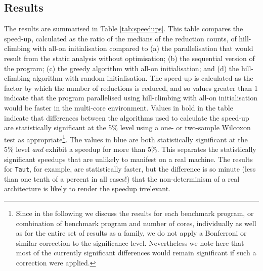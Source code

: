 \subsection{Results}

The results are summarised in Table \ref{tab:speedups}.  This table compares
the speed-up, calculated as the ratio of the medians of the reduction counts,
of hill-climbing with all-on initialisation compared to (a) the parallelisation
that would result from the static analysis without optimisation; (b) the
sequential version of the program; (c) the greedy algorithm with all-on
initialisation; and (d) the hill-climbing algorithm with random initialisation.
The speed-up is calculated as the factor by which the number of reductions is
reduced, and so values greater than 1 indicate that the program parallelised
using hill-climbing with all-on initialisation would be faster in the
multi-core environment.  Values in bold in the table indicate that differences
between the algorithms used to calculate the speed-up are statistically
significant at the 5\% level using a one- or two-sample Wilcoxon test as
appropriate\footnote{Since in the following we discuss the results for each
benchmark program, or combination of benchmark program and number of cores,
individually as well as for the entire set of results as a family, we do not
apply a Bonferroni or similar correction to the significance level.
Nevertheless we note here that most of the currently significant differences
would remain significant if such a correction were applied.}. The values in
blue are both statistically significant at the 5\% level \emph{and} exhibit a
speedup for more than 5\%. This separates the statistically significant
speedups that are unlikely to manifest on a real machine. The results for
\verb|Taut|, for example, are statistically faster, but the difference is so
minute (less than one tenth of a percent in all cases!) that the
non-determinism of a real architecture is likely to render the speedup
irrelevant.


